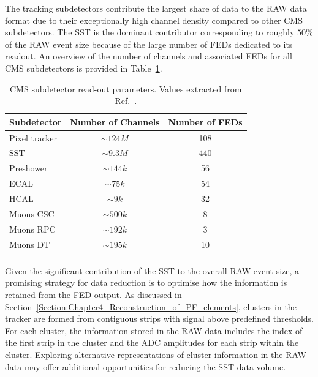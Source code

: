 The tracking subdetectors contribute the largest share of data to the RAW data format due to their exceptionally high channel density compared to other \ac{CMS} subdetectors. The \ac{SST} is the dominant contributor corresponding to roughly $50\%$ of the RAW event size because of the large number of \acp{FED} dedicated to its readout. An overview of the number of channels and associated \acp{FED} for all \ac{CMS} subdetectors is provided in Table~\ref{Table:Chapter4_RAW_Channels_FED}.

\begin{table}[!htbptbp]
\centering
\renewcommand{\arraystretch}{1.5} %
\begin{tabular}{|l|c|c|}
\hline
Subdetector & Number of Channels & Number of \acp{FED} \\
\hline \hline
Pixel tracker & $\sim124\unit{M}$ & 108 \\
\arrayrulecolor{lightgray} \hline
\ac{SST} & $\sim9.3\unit{M}$ & 440 \\
\arrayrulecolor{lightgray} \hline
Preshower & $\sim144\unit{k}$ & 56 \\
\arrayrulecolor{lightgray} \hline
\ac{ECAL} & $\sim75\unit{k}$ & 54 \\
\arrayrulecolor{lightgray} \hline
\ac{HCAL} & $\sim9\unit{k}$ & 32 \\
\arrayrulecolor{lightgray} \hline
Muons \ac{CSC} & $\sim500\unit{k}$ & 8 \\
\arrayrulecolor{lightgray} \hline
Muons \ac{RPC} & $\sim192\unit{k}$ & 3 \\
\arrayrulecolor{lightgray} \hline
Muons \ac{DT} & $\sim195\unit{k}$ & 10 \\
\arrayrulecolor{lightgray} \hline
\arrayrulecolor{black} \hline
\end{tabular}
\caption[CMS subdetector read-out parameters]{\ac{CMS} subdetector read-out parameters. Values extracted from Ref.~\cite{LHC_CMS,CMS_Tracker_Phase1_Upgrade_2}.}
\label{Table:Chapter4_RAW_Channels_FED}
\end{table}

Given the significant contribution of the \ac{SST} to the overall RAW event size, a promising strategy for data reduction is to optimise how the information is retained from the \ac{FED} output. As discussed in Section~\ref{Section:Chapter4_Reconstruction_of_PF_elements}, clusters in the tracker are formed from contiguous strips with signal above predefined thresholds. For each cluster, the information stored in the RAW data includes the index of the first strip in the cluster and the ADC amplitudes for each strip within the cluster. Exploring alternative representations of cluster information in the RAW data may offer additional opportunities for reducing the \ac{SST} data volume.

